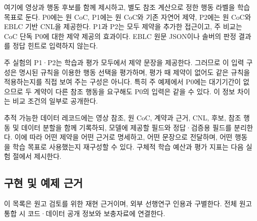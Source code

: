 \documentclass[11pt,a4paper]{article}
\begin{document}
여기에 영상과 행동 후보를 함께 제시하고, 별도 참조 계산으로 정한 행동 라벨을 학습 목표로 둔다. P0에는 원 CoC, P1에는 원 CoC와 기존 자연어 제약, P2에는 원 CoC와 EBLC 기반 CNL을 제공한다. P1과 P2는 모두 제약을 추가한 접근이고, 주 비교는 CoC 단독 P0에 대한 제약 제공의 효과이다. EBLC 원문 JSON이나 솔버의 판정 결과를 정답 힌트로 입력하지 않는다.\par

주 실험의 P1·P2는 학습과 평가 모두에서 제약 문장을 제공한다. 그러므로 이 입력 구성은 명시된 규칙을 이용한 행동 선택을 평가하며, 평가 때 제약이 없어도 같은 규칙을 적용하는지를 직접 보여 주는 구성은 아니다. 특히 주 예제에서 P0에는 대기기간이 없으므로 두 계약이 다른 참조 행동을 요구해도 P0의 입력은 같을 수 있다. 이 정보 차이는 비교 조건의 일부로 공개한다.\par

추적 가능한 데이터 레코드에는 영상 참조, 원 CoC, 계약과 근거, CNL, 후보, 참조 행동 및 데이터 분할을 함께 기록하되, 모델에 제공할 필드와 정답·검증용 필드를 분리한다. 이에 따라 어떤 제약을 어떤 근거로 명세하고, 어떤 문장으로 전달하며, 어떤 행동을 학습 목표로 사용했는지 재구성할 수 있다. 구체적 학습 예산과 평가 지표는 다음 실험 절에서 제시한다.\par

\begingroup\small\setlength{\parskip}{3pt}
\subsection*{구현 및 예제 근거}

이 목록은 원고 검토를 위한 재현 근거이며, 외부 선행연구 인용과 구별한다. 전체 원고 통합 시 코드·데이터 공개 정보와 보충자료에 연결한다.\par
\end{document}
